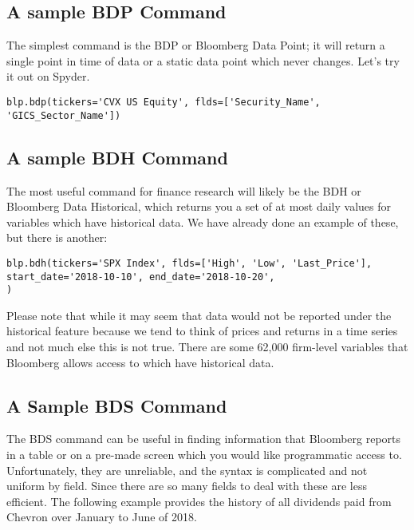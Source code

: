\documentclass[]{book}
\begin{document}
\subsection{A sample BDP Command}\label{a-sample-bdp-command}

The simplest command is the BDP or Bloomberg Data Point; it will return
a single point in time of data or a static data point which never
changes. Let's try it out on Spyder.

\begin{verbatim}
blp.bdp(tickers='CVX US Equity', flds=['Security_Name', 'GICS_Sector_Name'])
\end{verbatim}

\subsection{A sample BDH Command}\label{a-sample-bdh-command}

The most useful command for finance research will likely be the BDH or
Bloomberg Data Historical, which returns you a set of at most daily
values for variables which have historical data. We have already done an
example of these, but there is another:

\begin{verbatim}
blp.bdh(tickers='SPX Index', flds=['High', 'Low', 'Last_Price'],
start_date='2018-10-10', end_date='2018-10-20',
)
\end{verbatim}

Please note that while it may seem that data would not be reported under
the historical feature because we tend to think of prices and returns in
a time series and not much else this is not true. There are some 62,000
firm-level variables that Bloomberg allows access to which have
historical data.

\subsection{A Sample BDS Command}\label{a-sample-bds-command}

The BDS command can be useful in finding information that Bloomberg
reports in a table or on a pre-made screen which you would like
programmatic access to. Unfortunately, they are unreliable, and the
syntax is complicated and not uniform by field. Since there are so many
fields to deal with these are less efficient. The following example
provides the history of all dividends paid from Chevron over January to
June of 2018.
\end{document}
